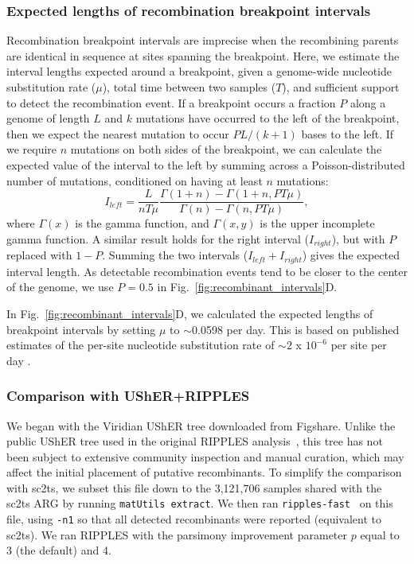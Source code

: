\documentclass[12pt]{article}
\newcommand{\figref}[1]{Fig.~\ref{#1}}
\begin{document}
\subsubsection*{Expected lengths of recombination breakpoint intervals}

Recombination breakpoint intervals are imprecise
when the recombining parents are identical in sequence
at sites spanning the breakpoint.
Here, we estimate the interval lengths expected around a breakpoint,
given a genome-wide nucleotide substitution rate ($\mu$),
total time between two samples ($T$), and
sufficient support to detect the recombination event.
If a breakpoint occurs a fraction $P$
along a genome of length $L$ and
$k$ mutations have occurred to the left of the breakpoint,
then we expect the nearest mutation
to occur $P L / (k + 1)$ bases to the left.
If we require $n$ mutations on both sides of the breakpoint,
we can calculate the expected value of the interval to the left
by summing across a Poisson-distributed number of mutations,
conditioned on having at least $n$ mutations:
\[
I_{left} = \frac{L}{n T \mu} \frac{\Gamma(1+n) - \Gamma(1+n, P T \mu)}{
\Gamma(n) - \Gamma(n, P T \mu)},
\]
where $\Gamma(x)$ is the gamma function, and
$\Gamma(x, y)$ is the upper incomplete gamma function.
A similar result holds for the right interval ($I_{right}$),
but with $P$ replaced with $1-P$.
Summing the two intervals ($I_{left}+I_{right}$)
gives the expected interval length.
As detectable recombination events
tend to be closer to the center of the genome,
we use $P=0.5$ in \figref{fig:recombinant_intervals}D.

In \figref{fig:recombinant_intervals}D,
we calculated the expected lengths of breakpoint intervals
by setting $\mu$ to $\sim$0.0598 per day.
This is based on published estimates of
the per-site nucleotide substitution rate of
$\sim2$ x $10^{-6}$ per site per day
\cite{Duchene2020,Ghafari2022,Markov2023}.

\subsubsection*{Comparison with UShER+RIPPLES}
We began with the Viridian UShER tree downloaded from Figshare.
Unlike the public UShER tree used in the original RIPPLES analysis~\cite{Turakhia2022},
this tree has not been subject to extensive community inspection and manual curation,
which may affect the initial placement of putative recombinants.
To simplify the comparison with sc2ts, we subset this
file down to the 3,121,706 samples shared with the sc2ts ARG
by running \texttt{matUtils extract}.
We then ran \texttt{ripples-fast}~\cite{Smith2023tracking}
on this file, using \texttt{-n1} so that all detected
recombinants were reported (equivalent to sc2ts). We ran
RIPPLES with the parsimony improvement parameter $p$
equal to 3 (the default) and 4.
\end{document}
